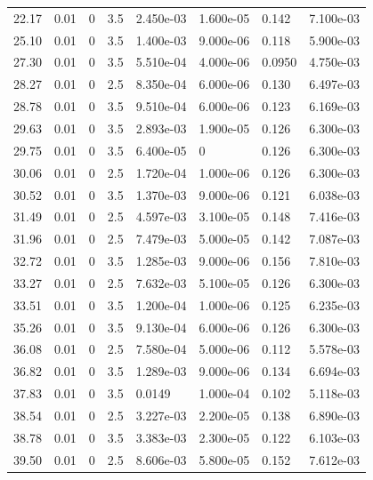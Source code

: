 \documentclass[preview]{standalone}
\begin{document}
{{\begin{tabular}{L{1.2cm}C{1.2cm} C{0.3cm}C{0.5cm} C{1.4cm}C{1.4cm} C{1.4cm}C{1.4cm}}
  22.17  &  0.01  & 0     & 3.5 &  2.450e-03  & 1.600e-05  & 0.142 &  7.100e-03   \\ 
  25.10  &  0.01  & 0     & 3.5 &  1.400e-03  & 9.000e-06  & 0.118 &  5.900e-03   \\ 
  27.30  &  0.01  & 0     & 3.5 &  5.510e-04  & 4.000e-06  & 0.0950 &  4.750e-03   \\ 
  28.27  &  0.01  & 0     & 2.5 &  8.350e-04  & 6.000e-06  & 0.130 &  6.497e-03   \\ 
  28.78  &  0.01  & 0     & 3.5 &  9.510e-04  & 6.000e-06  & 0.123 &  6.169e-03   \\ 
  29.63  &  0.01  & 0     & 3.5 &  2.893e-03  & 1.900e-05  & 0.126 &  6.300e-03   \\ 
  29.75  &  0.01  & 0     & 3.5 &  6.400e-05  & 0  & 0.126 &  6.300e-03   \\ 
  30.06  &  0.01  & 0     & 2.5 &  1.720e-04  & 1.000e-06  & 0.126 &  6.300e-03   \\ 
  30.52  &  0.01  & 0     & 3.5 &  1.370e-03  & 9.000e-06  & 0.121 &  6.038e-03   \\ 
  31.49  &  0.01  & 0     & 2.5 &  4.597e-03  & 3.100e-05  & 0.148 &  7.416e-03   \\ 
  31.96  &  0.01  & 0     & 2.5 &  7.479e-03  & 5.000e-05  & 0.142 &  7.087e-03   \\ 
  32.72  &  0.01  & 0     & 3.5 &  1.285e-03  & 9.000e-06  & 0.156 &  7.810e-03   \\ 
  33.27  &  0.01  & 0     & 2.5 &  7.632e-03  & 5.100e-05  & 0.126 &  6.300e-03   \\ 
  33.51  &  0.01  & 0     & 3.5 &  1.200e-04  & 1.000e-06  & 0.125 &  6.235e-03   \\ 
  35.26  &  0.01  & 0     & 3.5 &  9.130e-04  & 6.000e-06  & 0.126 &  6.300e-03   \\ 
  36.08  &  0.01  & 0     & 2.5 &  7.580e-04  & 5.000e-06  & 0.112 &  5.578e-03   \\ 
  36.82  &  0.01  & 0     & 3.5 &  1.289e-03  & 9.000e-06  & 0.134 &  6.694e-03   \\ 
  37.83  &  0.01  & 0     & 3.5 &  0.0149  & 1.000e-04  & 0.102 &  5.118e-03   \\ 
  38.54  &  0.01  & 0     & 2.5 &  3.227e-03  & 2.200e-05  & 0.138 &  6.890e-03   \\ 
  38.78  &  0.01  & 0     & 3.5 &  3.383e-03  & 2.300e-05  & 0.122 &  6.103e-03   \\ 
  39.50  &  0.01  & 0     & 2.5 &  8.606e-03  & 5.800e-05  & 0.152 &  7.612e-03   \\ 

\end{tabular}}}
\end{document}

